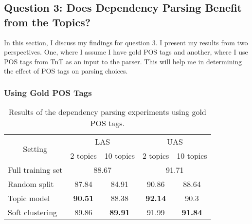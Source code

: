 
\subsection*{Question 3: Does Dependency Parsing Benefit from the Topics?}

In this section, I discuss my findings for question 3. I present my results from two perspectives. One, where I assume I have gold POS tags and another, where I use POS tags from TnT as an input to the parser. This will help me in determining the effect of POS tags on parsing choices. 

\subsubsection{Using Gold POS Tags}\label{sec:goldpos}

\begin{table*}[t!]
	\centering
	\begin{tabular}{l|cc|cc}
		\multicolumn{1}{c|}{\multirow{2}{*}{Setting}} & \multicolumn{2}{c|}{LAS}                                      & \multicolumn{2}{c}{UAS}                                     \\
		\multicolumn{1}{c|}{}                         & \multicolumn{1}{l}{2 topics} & \multicolumn{1}{r|}{10 topics} & \multicolumn{1}{l}{2 topics} & \multicolumn{1}{r}{10 topics} \\ \hline
		Full training set                             & \multicolumn{2}{c|}{88.67}                                    & \multicolumn{2}{c}{91.71}                                   \\
		Random split                                  & 87.84                        & 84.91                          & 90.86                        & 88.64                         \\
		Topic model                                   & \textbf{90.51}               & 88.38                          & \textbf{92.14}               & 90.3                          \\
		Soft clustering                               & 89.86                        & \textbf{89.91}                 & 91.99                        & \textbf{91.84}                \\ \hline
	\end{tabular}
	\caption{Results of the dependency parsing experiments using gold POS tags.}
	\label{tab:tmvsfs}
\end{table*}

